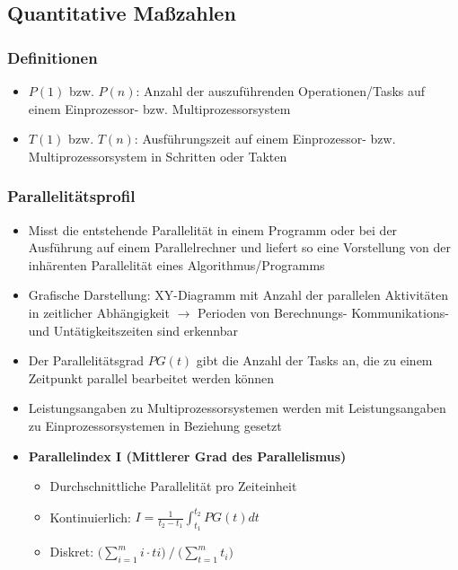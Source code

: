 \subsection{Quantitative Maßzahlen}

\subsubsection{Definitionen}
\begin{itemize}
	\item \(P(1)\) bzw. \(P(n)\): Anzahl der auszuführenden Operationen/Tasks auf einem Einprozessor- bzw. Multiprozessorsystem
	\item \(T(1)\) bzw. \(T(n)\): Ausführungszeit auf einem Einprozessor- bzw. Multiprozessorsystem in Schritten oder Takten
\end{itemize}

\subsubsection{Parallelitätsprofil}
\begin{itemize}
	\item Misst die entstehende Parallelität in einem Programm oder bei der Ausführung auf einem Parallelrechner und liefert so eine Vorstellung von der inhärenten Parallelität eines Algorithmus/Programms
	\item Grafische Darstellung: XY-Diagramm mit Anzahl der parallelen Aktivitäten in zeitlicher Abhängigkeit \(\rightarrow\) Perioden von Berechnungs- Kommunikations- und Untätigkeitszeiten sind erkennbar
	\item Der Parallelitätsgrad \(PG(t)\) gibt die Anzahl der Tasks an, die zu einem Zeitpunkt parallel bearbeitet werden können
	\item Leistungsangaben zu Multiprozessorsystemen werden mit Leistungsangaben zu Einprozessorsystemen in Beziehung gesetzt
	\item \textbf{Parallelindex I (Mittlerer Grad des Parallelismus)}
	\begin{itemize}
		\item Durchschnittliche Parallelität pro Zeiteinheit
		\item Kontinuierlich: \(I = \frac{1}{t_2-t_1}\int_{t_1}^{t_2}PG(t)dt\)
		\item Diskret: \(\Big(\sum_{i=1}^m i\cdot ti\Big)~/~\Big(\sum_{t=1}^mt_i\Big)\)
	\end{itemize}
\end{itemize}

